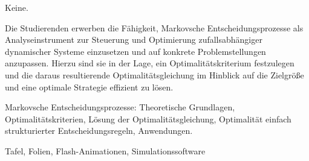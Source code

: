 \begin{course}

\setdoclanguagegerman
{}



\coursehead


\label{cour_7911.dp_997}


\begin{styleenv}
\begin{assessment}

\end{assessment}

\begin{conditions}Keine.\end{conditions}


\end{styleenv}

\begin{learningoutcomes}
Die Studierenden erwerben die Fähigkeit, Markovsche Entscheidungsprozesse als Analyseinstrument zur Steuerung und Optimierung zufallsabhängiger dynamischer Systeme einzusetzen und auf konkrete Problemstellungen anzupassen. Hierzu sind sie in der Lage, ein Optimalitätskriterium festzulegen und die daraus resultierende Optimalitätsgleichung im Hinblick auf die Zielgröße und eine optimale Strategie effizient zu lösen.


\end{learningoutcomes}

\begin{content}
Markovsche Entscheidungsprozesse: Theoretische Grundlagen, Optimalitätskriterien, Lösung der Optimalitätsgleichung, Optimalität einfach strukturierter Entscheidungsregeln, Anwendungen.


\end{content}

\begin{media}Tafel, Folien, Flash-Animationen, Simulationssoftware


\end{media}
\end{course}
